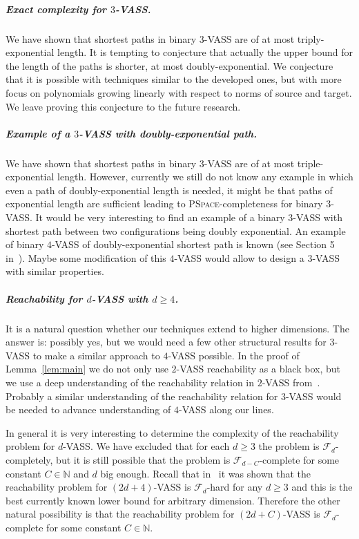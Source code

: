 \documentclass[a4paper, UKenglish, cleveref, autoref, thm-restate]{lipics-v2021}
\newcommand{\F}{\mathcal{F}}
\newcommand{\N}{\mathbb{N}}
\newcommand{\pspace}{\textsc{PSpace}\xspace}
\newcommand{\para}[1]{\vspace{-3mm}\subparagraph*{\bf #1.}}
\begin{document}
\para{Exact complexity for $3$-VASS}
We have shown that shortest paths in binary $3$-VASS are of at most triply-exponential length.
It is tempting to conjecture that actually the upper bound for the length of the paths is shorter,
at most doubly-exponential. We conjecture that it is possible with techniques similar to the developed ones,
but with more focus on polynomials growing linearly with respect to norms of source and target.
We leave proving this conjecture to the future research.

\para{Example of a $3$-VASS with doubly-exponential path}
We have shown that shortest paths in binary $3$-VASS are of at most triple-exponential length.
However, currently we still do not know any example in which even a path of doubly-exponential length is needed,
it might be that paths of exponential length are sufficient leading to \pspace-completeness for binary $3$-VASS.
It would be very interesting to find an example of a binary $3$-VASS with shortest path between two configurations
being doubly exponential. An example of binary $4$-VASS of doubly-exponential shortest path is known (see Section 5 in~\cite{DBLP:conf/concur/Czerwinski0LLM20}). Maybe some modification of this $4$-VASS would allow to design a $3$-VASS with similar properties.

\para{Reachability for $d$-VASS with $d \geq 4$}
It is a natural question whether our techniques extend to higher dimensions.
The answer is: possibly yes, but we would need a few other structural results for $3$-VASS
to make a similar approach to $4$-VASS possible. In the proof of Lemma~\ref{lem:main} we do not only
use $2$-VASS reachability as a black box, but we use a deep understanding of the reachability relation in $2$-VASS
from~\cite{DBLP:conf/focs/0001CMOSW24}. Probably a similar understanding of the reachability relation for $3$-VASS would be needed
to advance understanding of $4$-VASS along our lines. 

In general it is very interesting to determine the complexity of the reachability problem for $d$-VASS.
We have excluded that for each $d \geq 3$ the problem is $\F_d$-completely, but it is still possible that
the problem is $\F_{d-C}$-complete for some constant $C \in \N$ and $d$ big enough.
Recall that in~\cite{DBLP:conf/fsttcs/CzerwinskiJ0LO23}
it was shown that the reachability problem for $(2d+4)$-VASS is $\F_d$-hard for any $d \geq 3$ and this
is the best currently known lower bound for arbitrary dimension.
Therefore the other natural possibility is that the reachability problem for $(2d+C)$-VASS is $\F_d$-complete for some
constant $C \in \N$. 
\end{document}

